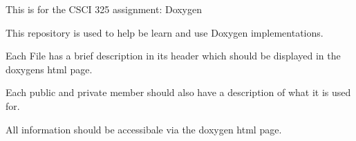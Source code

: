 This is for the CSCI 325 assignment\+: Doxygen

This repository is used to help be learn and use Doxygen implementations.

Each File has a brief description in it\textquotesingle{}s header which should be displayed in the doxygen\textquotesingle{}s html page.

Each public and private member should also have a description of what it is used for.

All information should be accessibale via the doxygen html page. 